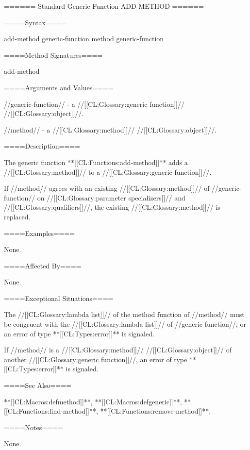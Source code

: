 ====== Standard Generic Function ADD-METHOD ======

====Syntax====

\DefgenWithValues add-method {generic-function method} {generic-function}

====Method Signatures====

\Defmeth add-method {}

====Arguments and Values====

//generic-function// - a //[[CL:Glossary:generic function]]// //[[CL:Glossary:object]]//.

//method// - a //[[CL:Glossary:method]]// //[[CL:Glossary:object]]//.

====Description====

The generic function **[[CL:Functions:add-method]]** adds a //[[CL:Glossary:method]]// to a //[[CL:Glossary:generic function]]//.

If //method// agrees with an existing //[[CL:Glossary:method]]// of //generic-function// on //[[CL:Glossary:parameter specializers]]// and //[[CL:Glossary:qualifiers]]//, the existing //[[CL:Glossary:method]]// is replaced.


====Examples====

None.


====Affected By====

None.

====Exceptional Situations====

The //[[CL:Glossary:lambda list]]// of the method function of //method// must be congruent with the //[[CL:Glossary:lambda list]]// of //generic-function//, or an error of type **[[CL:Types:error]]** is signaled.

If //method// is a //[[CL:Glossary:method]]// //[[CL:Glossary:object]]// of another //[[CL:Glossary:generic function]]//, an error of type **[[CL:Types:error]]** is signaled.


====See Also====

**[[CL:Macros:defmethod]]**, **[[CL:Macros:defgeneric]]**, **[[CL:Functions:find-method]]**, **[[CL:Functions:remove-method]]**, {\secref\SpecializerQualifierAgreement}

====Notes====

None.





